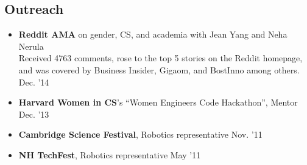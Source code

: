 \documentclass[margin]{res}
\begin{document}
\begin{resume}
 
%		 
		
 
		

		 

%		 
 




\section{Outreach}
\begin{itemize}[leftmargin=*] \itemsep -2pt
\item {\bf Reddit AMA} on gender, CS, and academia with Jean Yang and Neha Nerula  \\
Received 4763 comments, rose to the top 5 stories on the Reddit homepage, and was covered by Business Insider, Gigaom, and BostInno among others. \hfill Dec. '14
\item {\bf Harvard Women in CS}'s ``Women Engineers Code Hackathon'', Mentor \hfill Dec. '13
\item {\bf Cambridge Science Festival}, Robotics representative \hfill Nov. '11
\item {\bf NH TechFest}, Robotics representative \hfill May '11


\end{itemize}
\end{resume}
\end{document}
